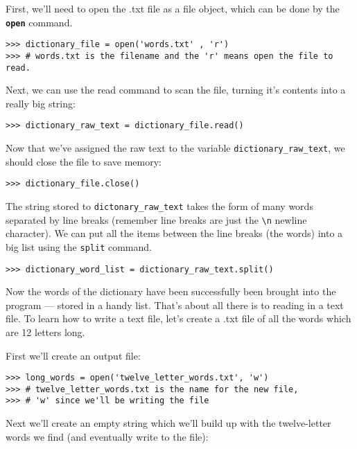 First, we'll need to open the .txt file as a file object, which can be done by the \texttt{\textbf{open}} command.

\begin{lstlisting}[numbers=none]
>>> dictionary_file = open('words.txt' , 'r') 
>>> # words.txt is the filename and the 'r' means open the file to read.
\end{lstlisting}

Next, we can use the read command to scan the file, turning it's contents into a really big string:

\begin{lstlisting}[numbers=none]
>>> dictionary_raw_text = dictionary_file.read()
\end{lstlisting}

Now that we've assigned the raw text to the variable \texttt{dictionary\_raw\_text}, we should close the file to save memory:

\begin{lstlisting}[numbers=none]
>>> dictionary_file.close()
\end{lstlisting}

The string stored to \texttt{dictonary\_raw\_text} takes the form of many words separated by line breaks (remember line breaks are just the \texttt{\textbackslash n} newline character). We can put all the items between the line breaks (the words) into a big list using the \texttt{split} command.

\begin{lstlisting}[numbers=none]
>>> dictionary_word_list = dictionary_raw_text.split()
\end{lstlisting}

Now the words of the dictionary have been successfully been brought into the program --- stored in a handy list. That's about all there is to reading in a text file. To learn how to write a text file, let's create a .txt file of all the words which are 12 letters long.

First we'll create an output file:

\begin{lstlisting}[numbers=none]
>>> long_words = open('twelve_letter_words.txt', 'w') 
>>> # twelve_letter_words.txt is the name for the new file, 
>>> # 'w' since we'll be writing the file
\end{lstlisting}

Next we'll create an empty string which we'll build up with the twelve-letter words we find (and eventually write to the file):

